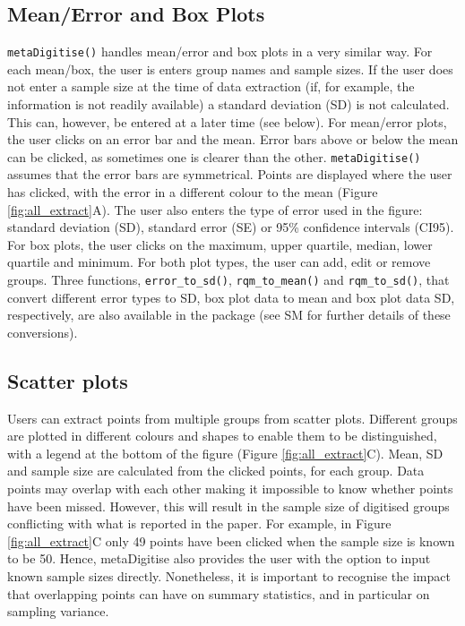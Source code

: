 \documentclass[12pt]{article}
\newcommand{\fct}[1]{\texttt{#1()}}
\newcommand{\pkg}[1]{{\fontseries{b}\selectfont #1}}
\begin{document}
\subsection{Mean/Error and Box Plots} 
\fct{metaDigitise} handles mean/error and box plots in a very similar way. For each mean/box, the user is enters group names and sample sizes. If the user does not enter a sample size at the time of data extraction (if, for example, the information is not readily available) a standard deviation (SD) is not calculated. This can, however, be entered at a later time (see below). For mean/error plots, the user clicks on an error bar and the mean. Error bars above or below the mean can be clicked, as sometimes one is clearer than the other. \fct{metaDigitise} assumes that the error bars are symmetrical. Points are displayed where the user has clicked, with the error in a different colour to the mean (Figure \ref{fig:all_extract}A). The user also enters the type of error used in the figure: standard deviation (SD), standard error (SE) or 95\% confidence intervals (CI95). For box plots, the user clicks on the maximum, upper quartile, median, lower quartile and minimum. For both plot types, the user can add, edit or remove groups. Three functions, \fct{error\_to\_sd}, \fct{rqm\_to\_mean} and \fct{rqm\_to\_sd}, that convert different error types to SD, box plot data to mean and box plot data SD, respectively, are also available in the package (see SM for further details of these conversions).

\subsection{Scatter plots}
Users can extract points from multiple groups from scatter plots. Different groups are plotted in different colours and shapes to enable them to be distinguished, with a legend at the bottom of the figure (Figure \ref{fig:all_extract}C). Mean, SD and sample size are calculated from the clicked points, for each group. Data points may overlap with each other making it impossible to know whether points have been missed. However, this will result in the sample size of digitised groups conflicting with what is reported in the paper. For example, in Figure \ref{fig:all_extract}C only 49 points have been clicked when the sample size is known to be 50. Hence, \pkg{metaDigitise} also provides the user with the option to input known sample sizes directly. Nonetheless, it is important to recognise the impact that overlapping points can have on summary statistics, and in particular on sampling variance.
\end{document}
